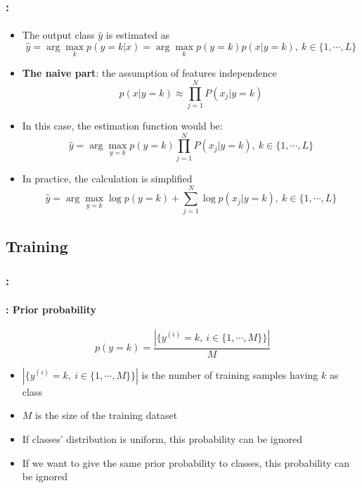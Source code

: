 \documentclass[xcolor=table]{beamer}
\begin{document}
\begin{frame}
	\frametitle{\insertshortsubtitle: \insertsection}
	\framesubtitle{\insertsubsection}
	
	\begin{itemize}
		\item The output class $ \hat{y} $ is estimated as
		\[\hat{y} = \arg\max_{k} p(y=k|x) = \arg\max_{k} p(y=k) p(x|y=k),\ k \in \{1, \cdots, L\} \]
		
		\item \textbf{The naive part}: the assumption of features independence
		\[p(x|y=k) \approx \prod_{j=1}^{N} P(x_j|y=k)\]
		
		\item In this case, the estimation function would be:
		\[\hat{y} = \arg\max_{y=k} p(y=k) \prod_{j=1}^{N} P(x_j|y=k),\ k \in \{1, \cdots, L\}\]
		
		\item In practice, the calculation is simplified 
		\[\hat{y} = \arg\max_{y=k} \log p(y=k) + \sum_{j=1}^{N} \log p(x_j|y=k),\ k \in \{1, \cdots, L\}\]
	\end{itemize}
	
\end{frame}

\subsection{Training}

\begin{frame}
	\frametitle{\insertshortsubtitle: \insertsection}
	\framesubtitle{\insertsubsection: Prior probability}
	
	\[p(y=k) = \frac{|\{y^{(i)} = k,\ i \in \{1, \cdots, M\}\}|}{M}\]
	
	\begin{itemize}
		\item $|\{y^{(i)} = k,\ i \in \{1, \cdots, M\}\}|$ is the number of training samples having $k$ as class
		\item $M$ is the size of the training dataset
		\item If classes' distribution is uniform, this probability can be ignored 
		\item If we want to give the same prior probability to classes, this probability can be ignored
	\end{itemize}
	
\end{frame}
\end{document}
